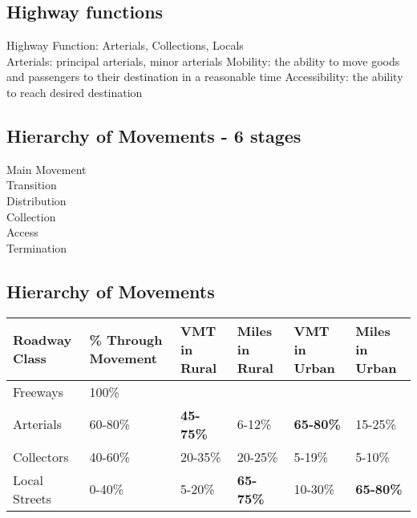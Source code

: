 \documentclass{article}
\begin{document}
  \subsection{Highway functions}
    Highway Function: Arterials, Collections, Locals \\
    Arterials: principal arterials, minor arterials
    Mobility: the ability to move goods and passengers to their destination in a reasonable time 
    Accessibility: the ability to reach desired destination

  \subsection{Hierarchy of Movements - 6 stages}
  Main Movement \\
  Transition \\
  Distribution \\
  Collection \\
  Access \\
  Termination \\

  \subsection{Hierarchy of Movements}
	\begin{tabular}{|l|p{2cm}|p{2cm}|p{2cm}|p{2cm}|p{2cm}|}
	\hline
	\textbf{Roadway Class} & \textbf{\% Through Movement} & \textbf{VMT in Rural} & \textbf{Miles in Rural} & \textbf{VMT in Urban} & \textbf{Miles in Urban} \\
	\hline
	Freeways      & 100\%     &     &  \\
	Arterials     & 60-80\%   & {\bfseries 45-75\%} & 6-12\%  & {\bfseries 65-80\%}   & 15-25\% \\
	Collectors    & 40-60\%   & 20-35\% & 20-25\% & 5-19\%    & 5-10\% \\
	Local Streets & 0-40\%    & 5-20\%  & {\bfseries 65-75\%} & 10-30\%   & {\bfseries 65-80\%} \\
	\hline
	\end{tabular}
\end{document}
